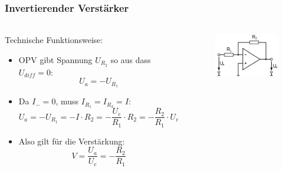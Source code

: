 \begin{frame}
\frametitle{Invertierender Verstärker}
\framesubtitle{}
    \begin{columns}[c]
            \begin{block}{Technische Funktionsweise:}
                \begin{itemize}
                    \item OPV gibt Spannung $U_{R_2}$ so aus dass $U_{diff} =0$:
                        \begin{equation*}
                            U_a = -U_{R_1}
                        \end{equation*}
                    \item Da $I_- = 0$, muss $I_{R_1} = I_{R_2}=I$:
                        \begin{equation*}
                            U_a = -U_{R_1} = -I \cdot R_2 = - \frac{U_e}{R_1}
                            \cdot
                            R_2 = -\frac{R_2}{R_1} \cdot U_e
                        \end{equation*}
                    \item Also gilt für die Verstärkung:
                        \begin{equation*}
                            V = \frac{U_a}{U_e} = - \frac{R_2}{R_1}
                        \end{equation*}
                \end{itemize}
            \end{block}
            \begin{figure}[H]
            \begin{center}
                    \includegraphics[scale=0.2]{./img/schaltung/inv_verst_0.png}
            \end{center}
            \end{figure}
    \end{columns}
\end{frame}

